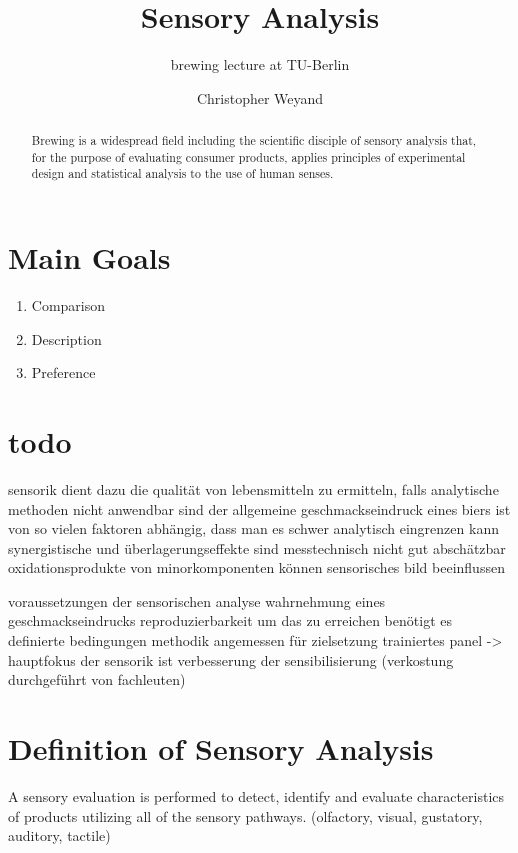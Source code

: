 \documentclass[]{scrartcl}
\begin{document}
\title{Sensory Analysis}
\subtitle{brewing lecture at TU-Berlin}
\author{Christopher Weyand}
\maketitle
\begin{abstract}
Brewing is a widespread field including the scientific disciple of sensory analysis
that, for the purpose of evaluating consumer products, applies principles of experimental
design and statistical analysis to the use of human senses.
\end{abstract}
\newpage

\tableofcontents
\newpage

\listoffigures
\newpage


\section{Main Goals}
\begin{enumerate}
  \item Comparison
  \item Description
  \item Preference
\end{enumerate}


\section{todo}
sensorik dient dazu die qualität von lebensmitteln zu ermitteln, falls analytische methoden nicht anwendbar sind
der allgemeine geschmackseindruck eines biers ist von so vielen faktoren abhängig, dass man es schwer analytisch eingrenzen kann
synergistische und überlagerungseffekte sind messtechnisch nicht gut abschätzbar
oxidationsprodukte von minorkomponenten können sensorisches bild beeinflussen

voraussetzungen der sensorischen analyse
	wahrnehmung eines geschmackseindrucks
	reproduzierbarkeit
	um das zu erreichen benötigt es definierte bedingungen
	methodik angemessen für zielsetzung
	trainiertes panel -> hauptfokus der sensorik ist verbesserung der sensibilisierung (verkostung durchgeführt von fachleuten)


\section{Definition of Sensory Analysis}
A sensory evaluation is performed to detect, identify and evaluate
characteristics of products utilizing all of the sensory pathways.
(olfactory, visual, gustatory, auditory, tactile)
\end{document}
